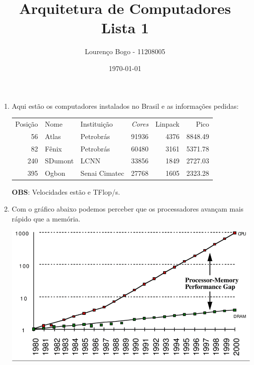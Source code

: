 \documentclass[11pt]{article}
\author{Lourenço Bogo - 11208005}
\date{\today}
\title{Arquitetura de Computadores Lista 1}
\begin{document}
\maketitle
\begin{enumerate}
\item Aqui estão os computadores instalados no Brasil e as informações pedidas:

\begin{center}
\begin{tabular}{rllrrr}
Posição & Nome & Instituição & \emph{Cores} & Linpack & Pico\\
56 & Atlas & Petrobrás & 91936 & 4376 & 8848.49\\
82 & Fênix & Petrobrás & 60480 & 3161 & 5371.78\\
240 & SDumont & LCNN & 33856 & 1849 & 2727.03\\
395 & Ogbon & Senai Cimatec & 27768 & 1605 & 2323.28\\
\end{tabular}
\end{center}

\textbf{OBS}: Velocidades estão e TFlop/s.

\item Com o gráfico abaixo podemos perceber que
os processadores avançam mais rápido que a memória.

\begin{center}
\includegraphics[width=.9\linewidth]{Processor-Memory-Performance-GapHen96.png}
\end{center}
\end{enumerate}
\end{document}
